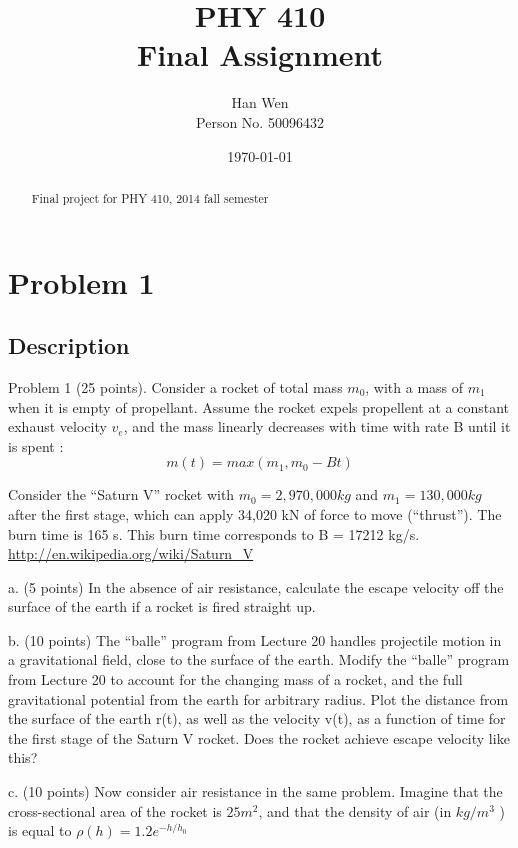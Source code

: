 \documentclass[11pt,letterpaper]{article}
\begin{document}
\title{PHY 410 \\ Final Assignment}
\author{Han Wen \\ \tiny Person No. 50096432}
\date{\today}

\maketitle

\begin{abstract}
Final project for PHY 410, 2014 fall semester


\end{abstract}

\tableofcontents

\newpage
\section{Problem 1}

\subsection{Description}
Problem 1 (25 points). Consider a rocket of total mass $m_0$, with a mass
of $m_1$ when it is empty of propellant. Assume the rocket expels propellent at
a constant exhaust velocity $v_e$, and the mass linearly decreases with time
with rate B until it is spent :
$$
m(t)=max(m_1,m_0-Bt)
$$

Consider the “Saturn V” rocket with $m_0 = 2, 970, 000 kg$ and $m_1 = 130, 000
kg$ after the first stage, which can apply 34,020 kN of force to move
(“thrust”). The burn time is 165 s. This burn time corresponds to B = 17212
kg/s.
\url{http://en.wikipedia.org/wiki/Saturn_V}

a. (5 points) In the absence of air resistance, calculate the escape
  velocity off the surface of the earth if a rocket is fired straight up. 

b. (10 points) The “balle” program from Lecture 20 handles projectile
      motion in a gravitational field, close to the surface of the earth. Modify
       the “balle” program from Lecture 20 to account for the changing mass
          of a rocket, and the full gravitational potential from the earth for
         arbitrary radius. Plot the distance from the surface of the earth r(t), as
        well as the velocity v(t), as a function of time for the first stage of the
         Saturn V rocket. Does the rocket achieve escape velocity like this? 

c. (10 points) Now consider air resistance in the same problem. Imagine
 that the cross-sectional area of the rocket is $25m^2$, and that the density
of air (in $kg/m^3$ ) is equal to $\rho{(h)} = 1.2 e^{-h/h_0}$
\end{document}
